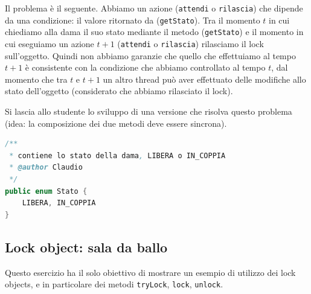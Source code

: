 \documentclass{article}
\begin{document}
Il problema \`e il seguente. Abbiamo un azione (\texttt{attendi} o \texttt{rilascia}) che dipende da una condizione: il valore ritornato da (\texttt{getStato}). Tra il momento $t$ in cui chiediamo alla dama il suo stato mediante il metodo (\texttt{getStato}) e il momento in cui eseguiamo un azione $t+1$ (\texttt{attendi} o \texttt{rilascia})  rilasciamo il lock sull'oggetto. Quindi non abbiamo garanzie che quello che effettuiamo al tempo $t+1$ \`e consistente con la condizione che abbiamo controllato al tempo $t$, dal momento che tra $t$ e $t+1$ un altro thread pu\`o aver effettuato delle modifiche allo stato dell'oggetto (considerato che abbiamo rilasciato il lock).

Si lascia allo studente lo sviluppo di una versione che risolva questo problema (idea: la composizione dei due metodi deve essere sincrona).

\begin{lstlisting}[language=Java]
/**
 * contiene lo stato della dama, LIBERA o IN_COPPIA
 * @author Claudio
 */
public enum Stato {
	LIBERA, IN_COPPIA
}
\end{lstlisting}

\subsection{Lock object: sala da ballo}

Questo esercizio ha il solo obiettivo di mostrare un esempio di utilizzo dei lock objects, e in particolare dei metodi \texttt{tryLock}, \texttt{lock}, \texttt{unlock}.
\end{document}
